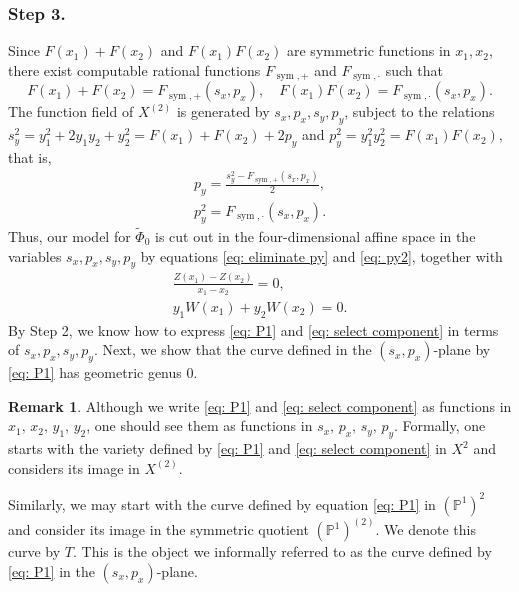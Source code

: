 \documentclass[a4paper,twoside,english]{amsart}
\theoremstyle{plain}
\theoremstyle{definition}
\newtheorem{remark}[theorem]{Remark}
\begin{document}
\subsubsection{Step 3.}
Since $F(x_1)+F(x_2)$ and $F(x_1)F(x_2)$ are symmetric functions in $x_1, x_2$, there exist computable rational functions $F_{\operatorname{sym}, +}$ and $F_{\operatorname{sym}, \cdot}$ such that
\[
F(x_1)+F(x_2) = F_{\operatorname{sym}, +}(s_x, p_x), \quad F(x_1)F(x_2) = F_{\operatorname{sym}, \cdot}(s_x, p_x).
\]
The function field of $X^{(2)}$ is generated by $s_x, p_x, s_y, p_y$, subject to the relations $s_y^2 = y_1^2 + 2y_1y_2 + y_2^2 = F(x_1)+F(x_2)+2p_y$ and $p_y^2=y_1^2y_2^2=F(x_1)F(x_2)$, that is,
\begin{eqnarray}
    p_y = \frac{s_y^2 - F_{\operatorname{sym}, +}(s_x, p_x)}{2}, \label{eq: eliminate py} \\
p_y^2 = F_{\operatorname{sym}, \cdot}(s_x, p_x). \label{eq: py2}
\end{eqnarray}
Thus, our model for $\tilde{\Phi}_0$ is cut out in the four-dimensional affine space in the variables $s_x, p_x, s_y, p_y$ by equations \eqref{eq: eliminate py} and \eqref{eq: py2}, together with
\begin{eqnarray}
\frac{Z(x_1)-Z(x_2)}{x_1-x_2}=0, \label{eq: P1} \\
y_1W(x_1) + y_2W(x_2)=0. \label{eq: select component}
\end{eqnarray}
By Step 2, we know how to express \eqref{eq: P1} and \eqref{eq: select component} in terms of $s_x, p_x, s_y, p_y$. 
Next, we show that the curve defined in the $(s_x, p_x)$-plane by \eqref{eq: P1} has geometric genus $0$. 


\begin{remark}
    Although we write \eqref{eq: P1} and \eqref{eq: select component} as functions in $x_1, \, x_2, \, y_1, \, y_2$, one should see them as functions in $s_x, \, p_x, \, s_y, \, p_y$. Formally, one starts with the variety defined by \eqref{eq: P1} and \eqref{eq: select component} in $X^2$ and considers its image in $X^{(2)}$.

    Similarly, we may start with the curve defined by equation \eqref{eq: P1} in $(\mathbb{P}^1)^2$ and consider its image in the symmetric quotient $(\mathbb{P}^1)^{(2)}$. We denote this curve by $T$. This is the object we informally referred to as the curve defined by \eqref{eq: P1} in the $(s_x, p_x)$-plane.
\end{remark}
\end{document}
